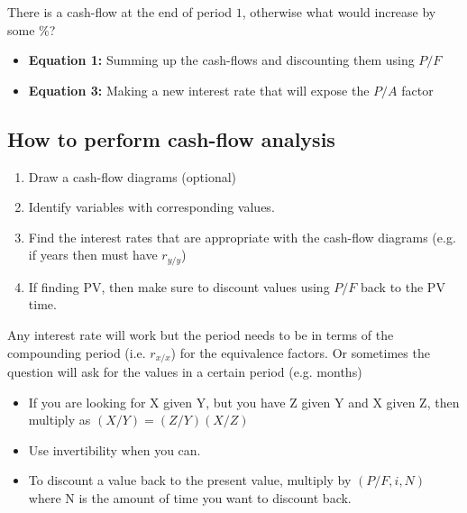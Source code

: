    \begin{derivation}
        There is a cash-flow at the end of period $1$, otherwise what would increase by some $\%$?
        \begin{itemize}
            \item \textbf{Equation 1:} Summing up the cash-flows and discounting them using $P/F$
            \item \textbf{Equation 3:} Making a new interest rate that will expose the $P/A$ factor
        \end{itemize}
    \end{derivation}

\subsection{How to perform cash-flow analysis}
\begin{process}
    \begin{enumerate}
        \item Draw a cash-flow diagrams (optional)
        \item Identify variables with corresponding values.
        \item Find the interest rates that are appropriate with the cash-flow diagrams (e.g. if years then must have $r_{y/y}$)
        \item If finding PV, then make sure to discount values using $P/F$ back to the PV time.
    \end{enumerate}
\end{process}

\begin{warning}
    Any interest rate will work but the period needs to be in terms of the compounding period (i.e. $r_{x/x}$) for the equivalence factors. Or sometimes the question will ask for the values in a certain period (e.g. months)
\end{warning}

\begin{intuition}
    \begin{itemize}
        \item If you are looking for X given Y, but you have Z given Y and X given Z, then multiply as $(X/Y)=(Z/Y)(X/Z)$
        \item Use invertibility when you can.
        \item To discount a value back to the present value, multiply by $(P/F,i,N)$ where N is the amount of time you want to discount back.
    \end{itemize}
\end{intuition}
